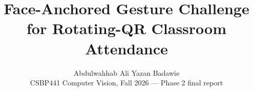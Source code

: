 \documentclass[10pt,twocolumn,letterpaper]{article}
\title{Face-Anchored Gesture Challenge for Rotating-QR Classroom Attendance}
\author{Abdulwahhab Ali \qquad Yazan Badawie\\
CSBP441 Computer Vision, Fall 2026 --- Phase 2 final report}
\begin{document}
\maketitle








{
\small


}
\end{document}
